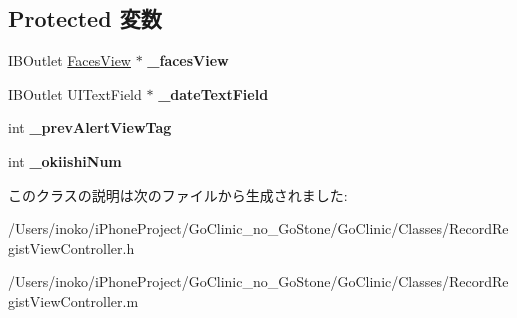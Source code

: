 \subsection*{Protected 変数}
\begin{DoxyCompactItemize}
\item 
\hypertarget{interface_record_regist_view_controller_a780cd2f3bc45e96bee12fbdae7dda4c2}{
IBOutlet \hyperlink{interface_faces_view}{FacesView} $\ast$ {\bfseries \_\-facesView}}
\label{interface_record_regist_view_controller_a780cd2f3bc45e96bee12fbdae7dda4c2}

\item 
\hypertarget{interface_record_regist_view_controller_a0d5bc2038e6bd996b7bf2c0ed6f2ed30}{
IBOutlet UITextField $\ast$ {\bfseries \_\-dateTextField}}
\label{interface_record_regist_view_controller_a0d5bc2038e6bd996b7bf2c0ed6f2ed30}

\item 
\hypertarget{interface_record_regist_view_controller_a5704c9a7f85c90d9c4b000d33b67473b}{
int {\bfseries \_\-prevAlertViewTag}}
\label{interface_record_regist_view_controller_a5704c9a7f85c90d9c4b000d33b67473b}

\item 
\hypertarget{interface_record_regist_view_controller_acfe4fd11557d50797f8a974484d4b7b4}{
int {\bfseries \_\-okiishiNum}}
\label{interface_record_regist_view_controller_acfe4fd11557d50797f8a974484d4b7b4}

\end{DoxyCompactItemize}


このクラスの説明は次のファイルから生成されました:\begin{DoxyCompactItemize}
\item 
/Users/inoko/iPhoneProject/GoClinic\_\-no\_\-GoStone/GoClinic/Classes/RecordRegistViewController.h\item 
/Users/inoko/iPhoneProject/GoClinic\_\-no\_\-GoStone/GoClinic/Classes/RecordRegistViewController.m\end{DoxyCompactItemize}
